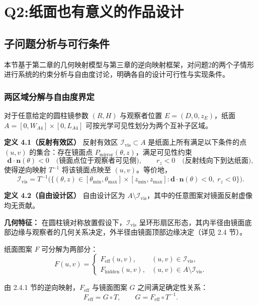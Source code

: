 \documentclass[12pt,a4paper]{ctexart}
\begin{document}
\section{Q2:纸面也有意义的作品设计}


\subsection{子问题分析与可行条件}

本节基于第二章的几何映射模型与第三章的逆向映射框架，对问题2的两个子情形进行系统的约束分析与自由度讨论，明确各自的设计可行性与实现条件。

\subsubsection{两区域分解与自由度界定}

对于任意给定的圆柱镜参数 $(R,H)$ 与观察者位置 $E=(D,0,z_E)$，纸面 $A=[0,W_{A4}]\times[0,L_{A4}]$ 可按光学可见性划分为两个互补子区域。

\textbf{定义 4.1（反射有效区）} 反射有效区 $\mathcal{I}_{\mathrm{vis}}\subset A$ 是纸面上所有满足以下条件的点 $(u,v)$ 的集合：存在镜面点 $P_{\mathrm{mirror}}(\theta,z)$，满足可见性约束
\[
\mathbf{d}\cdot \mathbf{n}(\theta)<0 \quad\text{(镜面点位于观察者可见侧)},\qquad r_z<0 \quad\text{(反射线向下到达纸面)},
\]
使得逆向映射 $T^{-1}$ 将该镜面点映至 $(u,v)$。等价地，
\[
\mathcal{I}_{\mathrm{vis}} = T^{-1}\bigl(\{(\theta,z)\in[\theta_{\min},\theta_{\max}]\times[z_{\min},z_{\max}]: \mathbf{d}\cdot\mathbf{n}(\theta)<0,\; r_z<0\}\bigr).
\]

\textbf{定义 4.2（自由设计区）} 自由设计区为 $A\setminus\mathcal{I}_{\mathrm{vis}}$，其中的任意图案对镜面反射虚像均无贡献。

\textbf{几何特征：} 在圆柱镜对称放置假设下，$\mathcal{I}_{\mathrm{vis}}$ 呈环形扇区形态，其内半径由镜面底部边缘与观察者的几何关系决定，外半径由镜面顶部边缘决定（详见 2.4 节）。

纸面图案 $F$ 可分解为两部分：
\[
F(u,v)=
\begin{cases}
F_{\mathrm{eff}}(u,v), & (u,v)\in\mathcal{I}_{\mathrm{vis}},\\
F_{\mathrm{hidden}}(u,v), & (u,v)\in A\setminus\mathcal{I}_{\mathrm{vis}}.
\end{cases}
\]

由 2.4.1 节的逆向映射，$F_{\mathrm{eff}}$ 与镜面图案 $G$ 之间满足确定性关系：
\[
F_{\mathrm{eff}} = G\circ T,\qquad
G = F_{\mathrm{eff}}\circ T^{-1}.
\]
\end{document}
